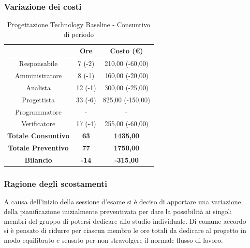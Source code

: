 \subsubsection{Variazione dei costi} \label{subsubsection:variazione_costi_TB}

\begin{table}[H]
  \centering
  \renewcommand{\arraystretch}{1.8}
  \begin{tabular}{c|c|c}
    \rowcolor[HTML]{125E28}
    \multicolumn{1}{c}{\color[HTML]{FFFFFF}\textbf{Ruolo}} &
    \multicolumn{1}{c}{\color[HTML]{FFFFFF}\textbf{Ore}}   &
    \multicolumn{1}{c}{\color[HTML]{FFFFFF}\textbf{Costo (€)}}                               \\
    \hline
    Responsabile                                           & 7 (-2)       & 210,00 (-60,00)  \\
    Amministratore                                         & 8 (-1)       & 160,00 (-20,00)  \\
    Analista                                               & 12 (-1)      & 300,00 (-25,00)  \\
    Progettista                                            & 33 (-6)      & 825,00 (-150,00) \\
    Programmatore                                          & -            & -                \\
    Verificatore                                           & 17 (-4)      & 255,00 (-60,00)  \\
    \textbf{Totale Consuntivo}                             & \textbf{63}  & \textbf{1435,00} \\
    \textbf{Totale Preventivo}                             & \textbf{77}  & \textbf{1750,00} \\
    \textbf{Bilancio}                                      & \textbf{-14} & \textbf{-315,00} \\
  \end{tabular}
  \caption{Progettazione Technology Baseline - Consuntivo di periodo}
\end{table}


\subsubsection{Ragione degli scostamenti} \label{subsubsection:ragione_scostamenti_TB}
A causa dell'inizio della sessione d'esame si è deciso di apportare una variazione della pianificazione inizialmente preventivata per dare la possibilità ai singoli membri del gruppo di potersi dedicare allo studio individuale.
Di comune accordo si è pensato di ridurre per ciascun membro le ore totali da dedicare al progetto in modo equilibrato e sensato per non stravolgere il normale flusso di lavoro.


